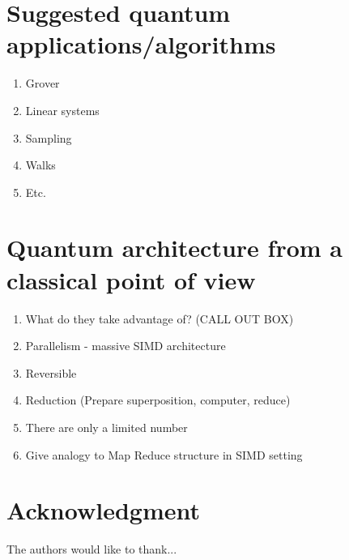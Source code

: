 \documentclass[journal]{IEEEtran}
\begin{document}
\appendices
\section{Suggested quantum applications/algorithms}

\begin{enumerate}
\item    Grover
\item     Linear systems
\item    Sampling
\item       Walks
\item       Etc.
\end{enumerate}

\section{Quantum architecture from a classical point of view}
\label{sec:box1}
\begin{enumerate}
\item      What do they take advantage of? (CALL OUT BOX)
\item  Parallelism - massive SIMD architecture
\item  Reversible
\item  Reduction (Prepare superposition, computer, reduce)
\item  There are only a limited number
\item  Give analogy to Map Reduce structure in SIMD setting
\end{enumerate}
\section*{Acknowledgment}


The authors would like to thank...


\ifCLASSOPTIONcaptionsoff
  \newpage
\fi




\end{document}
